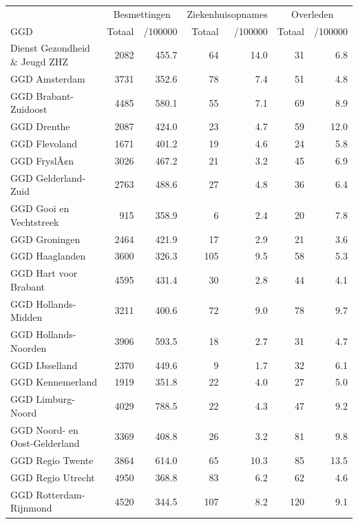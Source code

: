 \documentclass[
  english,
  man,floatsintext]{apa6}
\begin{document}
\begin{table}[H]
\centering\begingroup\fontsize{10}{12}\selectfont

\begin{threeparttable}
\begin{tabular}{lrrrrrr}
\toprule
\multicolumn{1}{c}{ } & \multicolumn{2}{c}{Besmettingen} & \multicolumn{2}{c}{Ziekenhuisopnames} & \multicolumn{2}{c}{Overleden} \\
\cmidrule(l{3pt}r{3pt}){2-3} \cmidrule(l{3pt}r{3pt}){4-5} \cmidrule(l{3pt}r{3pt}){6-7}
GGD & Totaal & /100000 & Totaal & /100000 & Totaal & /100000\\
\midrule
Dienst Gezondheid \& Jeugd ZHZ & 2082 & 455.7 & 64 & 14.0 & 31 & 6.8\\
GGD Amsterdam & 3731 & 352.6 & 78 & 7.4 & 51 & 4.8\\
GGD Brabant-Zuidoost & 4485 & 580.1 & 55 & 7.1 & 69 & 8.9\\
GGD Drenthe & 2087 & 424.0 & 23 & 4.7 & 59 & 12.0\\
GGD Flevoland & 1671 & 401.2 & 19 & 4.6 & 24 & 5.8\\
GGD FryslÃ¢n & 3026 & 467.2 & 21 & 3.2 & 45 & 6.9\\
GGD Gelderland-Zuid & 2763 & 488.6 & 27 & 4.8 & 36 & 6.4\\
GGD Gooi en Vechtstreek & 915 & 358.9 & 6 & 2.4 & 20 & 7.8\\
GGD Groningen & 2464 & 421.9 & 17 & 2.9 & 21 & 3.6\\
GGD Haaglanden & 3600 & 326.3 & 105 & 9.5 & 58 & 5.3\\
GGD Hart voor Brabant & 4595 & 431.4 & 30 & 2.8 & 44 & 4.1\\
GGD Hollands-Midden & 3211 & 400.6 & 72 & 9.0 & 78 & 9.7\\
GGD Hollands-Noorden & 3906 & 593.5 & 18 & 2.7 & 31 & 4.7\\
GGD IJsselland & 2370 & 449.6 & 9 & 1.7 & 32 & 6.1\\
GGD Kennemerland & 1919 & 351.8 & 22 & 4.0 & 27 & 5.0\\
GGD Limburg-Noord & 4029 & 788.5 & 22 & 4.3 & 47 & 9.2\\
GGD Noord- en Oost-Gelderland & 3369 & 408.8 & 26 & 3.2 & 81 & 9.8\\
GGD Regio Twente & 3864 & 614.0 & 65 & 10.3 & 85 & 13.5\\
GGD Regio Utrecht & 4950 & 368.8 & 83 & 6.2 & 62 & 4.6\\
GGD Rotterdam-Rijnmond & 4520 & 344.5 & 107 & 8.2 & 120 & 9.1\\

\end{tabular}
\end{threeparttable}
\end{table}
\end{document}
